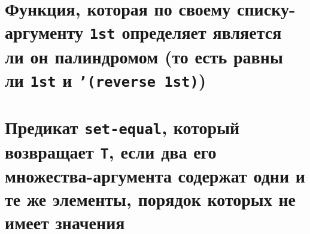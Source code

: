
\section{Функция, которая по своему списку-аргументу \texttt{1st} определяет является ли он палиндромом (то есть равны ли \texttt{1st} и \texttt{'(reverse 1st)})}



\section{Предикат \texttt{set-equal}, который возвращает \texttt{T}, если два его множества-аргумента содержат одни и те же элементы, порядок которых не имеет значения}
